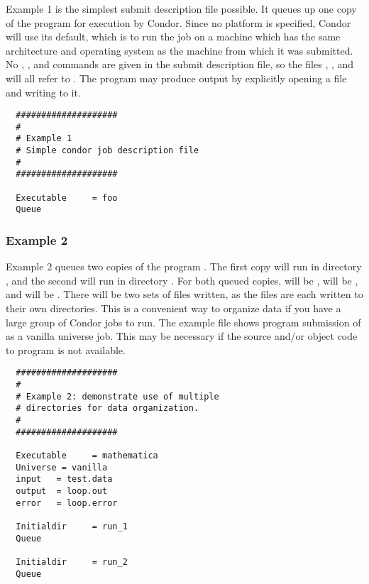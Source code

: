 Example 1 is the simplest submit description
file possible. It queues up one copy of the program  for execution
by Condor.
Since no platform is specified, Condor will use its default,
which is to run the job on a machine which has the
same architecture and operating system as the machine from which it was
submitted. 
No 
,
, and
commands are given in the submit
description file, so the
files , , and  will all refer to 
.
The program may produce output by explicitly opening a file and writing to
it.
\begin{verbatim}
  ####################                                                    
  # 
  # Example 1                                                                       
  # Simple condor job description file                                    
  #                                                                       
  ####################                                                    
                                                                          
  Executable     = foo                                                    
  Queue    
\end{verbatim}

\subsubsection{Example 2}

Example 2 queues two copies of the program . The
first copy will run in directory , and the second will run in
directory . For both queued copies, 
 will be ,
 will be , and
 will be .
There will be two sets of files written,
as the files are each written to their own directories.
This is a convenient way to organize data if you
have a large group of Condor jobs to run. The example file 
shows program submission of
 as a vanilla universe job.
This may be necessary if the source
and/or object code to program  is not available.
\begin{verbatim}
  ####################     
  #                       
  # Example 2: demonstrate use of multiple     
  # directories for data organization.      
  #                                        
  ####################                    
                                         
  Executable     = mathematica          
  Universe = vanilla                   
  input   = test.data                
  output  = loop.out                
  error   = loop.error             
                                  
  Initialdir     = run_1         
  Queue                         
                               
  Initialdir     = run_2      
  Queue                     
\end{verbatim}

